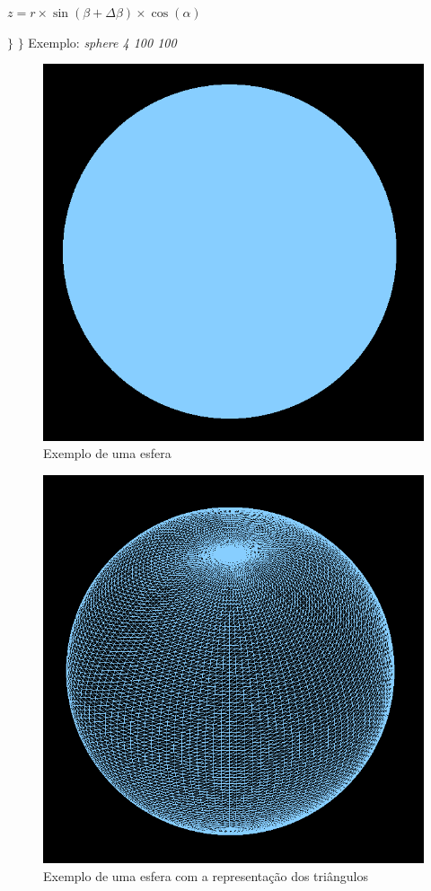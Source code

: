 \documentclass[12pt]{article}
\begin{document}
\par$z = r\times\sin(\beta + \Delta\beta)\times\cos(\alpha)$ \newline
\par $\}$ \newline
$\}$
\newpage
Exemplo: \textit{sphere 4 100 100}
\begin{figure}[H]
\centering\includegraphics[scale=0.35]{esferaP} 
\caption{\label{fig:controller}Exemplo de uma esfera}
\end{figure} \begin{figure}[H]
\centering\includegraphics[scale=0.35]{esferaT} 
\caption{\label{fig:controller}Exemplo de uma esfera com a representação dos triângulos}
\end{figure}
\newpage
\end{document}
